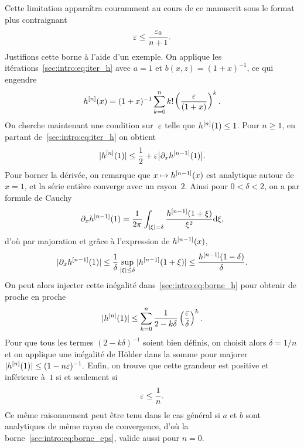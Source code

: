 Cette limitation apparaîtra couramment au cours de ce manuscrit sous le format plus contraignant
\begin{equation} \label{sec:intro:eq:borne_eps}
    \varepsilon \leq \frac{\varepsilon_0}{n+1} .
\end{equation}
Justifions cette borne à l'aide d'un exemple. On applique les itérations~\eqref{sec:intro:eq:iter_h} avec $a = 1$ et $b(x,z) = (1+x)^{-1}$, ce qui engendre
\begin{equation} \label{sec:intro:eq:borne_h}
    h^{[n]}(x) 
    = (1+x)^{-1} \sum_{k = 0}^{n} k! \left( 
        \frac{\varepsilon}{(1+x)}
    \right)^k .
\end{equation}
On cherche maintenant une condition sur~$\varepsilon$ telle que $h^{[n]}(1) \leq 1$. Pour $n \geq 1$, en partant de~\eqref{sec:intro:eq:iter_h} on obtient 
\begin{equation*}
    |h^{[n]}(1)| \leq \frac{1}{2} + \varepsilon \big| \partial_x h^{[n-1]}(1) \big| .
\end{equation*}
Pour borner la dérivée, on remarque que $x \mapsto h^{[n-1]}(x)$ est analytique autour de $x = 1$, et la série entière converge avec un rayon~$2$. Ainsi pour $0 < \delta < 2$, on a par formule de Cauchy 
\begin{equation*}
    \partial_x h^{[n-1]}(1) = \frac{1}{2\pi}
        \int_{|\xi|=\delta} \frac{h^{[n-1]}(1+\xi)}{\xi^2} \mathrm{d} \xi ,
\end{equation*}
d'où par majoration et grâce à l'expression de $h^{[n-1]}(x)$, 
\begin{equation*}
    |\partial_x h^{[n-1]}(1)| 
    \leq \frac{1}{\delta} \sup_{|\xi| \leq \delta} |h^{[n-1]}(1+\xi)|
    \leq \frac{h^{[n-1]}(1-\delta)}{\delta} .
\end{equation*}
On peut alors injecter cette inégalité dans~\eqref{sec:intro:eq:borne_h} pour obtenir de proche en proche
\begin{equation*}
    |h^{[n]}(1)| \leq \sum_{k=0}^{n} 
        \frac{1}{2-k\delta} \left(\frac{\varepsilon}{\delta}\right)^k .
\end{equation*}
Pour que tous les termes $(2-k\delta)^{-1}$ soient bien définis, on choisit alors $\delta = 1/n$ et on applique une inégalité de Hölder dans la somme pour majorer 
$
    |h^{[n]}(1)| \leq (1 - n\varepsilon)^{-1} .
$
Enfin, on trouve que cette grandeur est positive et inférieure à~$1$ si et seulement si  
\begin{equation*}
    \varepsilon \leq \frac{1}{n}.
\end{equation*}
Ce même raisonnement peut être tenu dans le cas général si $a$ et $b$ sont analytiques de même rayon de convergence, d'où la borne~\eqref{sec:intro:eq:borne_eps}, valide aussi pour $n = 0$.





